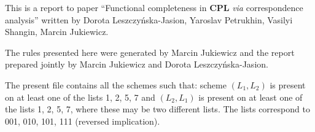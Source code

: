 \documentclass[11pt]{article}
\begin{document}
	
	This is a report to paper ``Functional completeness in \textbf{CPL} \textit{via} correspondence analysis'' written by Dorota Leszczy\'{n}ska-Jasion, 
	Yaroslav Petrukhin, Vasilyi Shangin, Marcin Jukiewicz. 
	
	The rules presented here were generated by Marcin Jukiewicz and the report prepared jointly by Marcin Jukiewicz and Dorota Leszczy\'{n}ska-Jasion.
	
	The present file contains all the schemes such that: scheme $(L_1, L_2)$ is present on at least one of the lists 1, 2, 5, 7 and $(L_2, L_1)$ is present on at least one of the lists 1, 2, 5, 7, where these may be two different lists. The lists correspond to 001, 010, 101, 111 (reversed implication).
	
	\bigskip
\begin{center}


\end{center}
\end{document}
